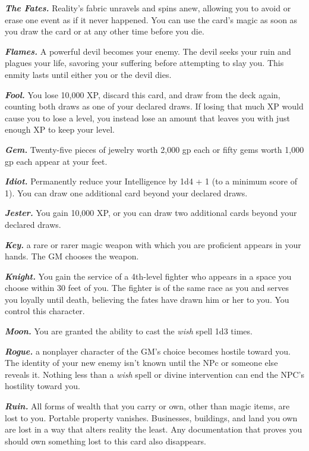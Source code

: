 \documentclass[
]{article}
\begin{document}
\emph{\textbf{The Fates.}} Reality's fabric unravels and spins anew,
allowing you to avoid or erase one event as if it never happened. You
can use the card's magic as soon as you draw the card or at any other
time before you die.

\emph{\textbf{Flames.}} A powerful devil becomes your enemy. The devil
seeks your ruin and plagues your life, savoring your suffering before
attempting to slay you. This enmity lasts until either you or the devil
dies.

\emph{\textbf{Fool.}} You lose 10,000 XP, discard this card, and draw
from the deck again, counting both draws as one of your declared draws.
If losing that much XP would cause you to lose a level, you instead lose
an amount that leaves you with just enough XP to keep your level.

\emph{\textbf{Gem.}} Twenty-five pieces of jewelry worth 2,000 gp each
or fifty gems worth 1,000 gp each appear at your feet.

\emph{\textbf{Idiot.}} Permanently reduce your Intelligence by 1d4 + 1
(to a minimum score of 1). You can draw one additional card beyond your
declared draws.

\emph{\textbf{Jester.}} You gain 10,000 XP, or you can draw two
additional cards beyond your declared draws.

\emph{\textbf{Key.}} a rare or rarer magic weapon with which you are
proficient appears in your hands. The GM chooses the weapon.

\emph{\textbf{Knight.}} You gain the service of a 4th-level fighter who
appears in a space you choose within 30 feet of you. The fighter is of
the same race as you and serves you loyally until death, believing the
fates have drawn him or her to you. You control this character.

\emph{\textbf{Moon.}} You are granted the ability to cast the
\emph{wish} spell 1d3 times.

\emph{\textbf{Rogue.}} a nonplayer character of the GM's choice becomes
hostile toward you. The identity of your new enemy isn't known until the
NPc or someone else reveals it. Nothing less than a \emph{wish} spell or
divine intervention can end the NPC's hostility toward you.

\emph{\textbf{Ruin.}} All forms of wealth that you carry or own, other
than magic items, are lost to you. Portable property vanishes.
Businesses, buildings, and land you own are lost in a way that alters
reality the least. Any documentation that proves you should own
something lost to this card also disappears.
\end{document}
